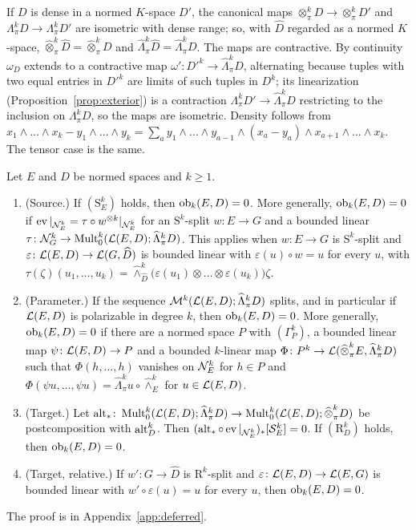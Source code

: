 If $D$ is dense in a normed $K$-space $D'$, the canonical maps $\otimes^k_\pi D\to\otimes^k_\pi D'$ and
$\Lambda^k_\pi D\to\Lambda^k_\pi D'$ are isometric with dense range; so, with $\widehat D$ regarded as a normed $K$-space,
$\widehat\otimes^k_\pi\widehat D=\widehat\otimes^k_\pi D$ and $\widehat\Lambda^k_\pi\widehat D=\widehat\Lambda^k_\pi D$.
The maps are contractive. By continuity $\omega_D$ extends to a contractive map $\omega'\colon D'^k\to\widehat\Lambda^k_\pi D$,
alternating because tuples with two equal entries in $D'^k$ are limits of such tuples in $D^k$; its linearization
(Proposition~\ref{prop:exterior}) is a contraction $\Lambda^k_\pi D'\to\widehat\Lambda^k_\pi D$ restricting to the
inclusion on $\Lambda^k_\pi D$, so the maps are isometric. Density follows from
$x_1\wedge\dots\wedge x_k-y_1\wedge\dots\wedge y_k=\sum_ay_1\wedge\dots\wedge y_{a-1}\wedge(x_a-y_a)\wedge x_{a+1}\wedge\dots\wedge x_k$.
The tensor case is the same.

\begin{theorem}\label{ob:thm:mechanisms}
Let $E$ and $D$ be normed spaces and $k\ge1$.
\begin{enumerate}
\item \textup{(Source.)} If $(\mathrm S^k_E)$ holds, then $\operatorname{ob}_k(E,D)=0$. More generally, $\operatorname{ob}_k(E,D)=0$ if
$\operatorname{ev}|_{\mathcal N^k_E}=\tau\circ w^{\otimes k}|_{\mathcal N^k_E}$ for an $\mathrm S^k$-split $w\colon E\to G$ and a bounded linear
$\tau\colon\mathcal N^k_G\to\operatorname{Mult}^k_0(\mathcal L(E,D);\widehat\Lambda^k_\pi D)$. This applies when $w\colon E\to G$ is
$\mathrm S^k$-split and $\varepsilon\colon\mathcal L(E,D)\to\mathcal L(G,\widehat D)$ is bounded linear with $\varepsilon(u)\circ w=u$
for every $u$, with
$\tau(\zeta)(u_1,\dots,u_k)=\widehat\wedge^k_{\widehat D}\bigl(\varepsilon(u_1)\otimes\dots\otimes\varepsilon(u_k)\bigr)\zeta$.
\item \textup{(Parameter.)} If the sequence $\mathcal M^k(\mathcal L(E,D);\widehat\Lambda^k_\pi D)$ splits, and in particular if
$\mathcal L(E,D)$ is polarizable in degree $k$, then $\operatorname{ob}_k(E,D)=0$. More generally, $\operatorname{ob}_k(E,D)=0$ if there are a normed space $P$ with $(\Gamma^k_P)$, a
bounded linear map $\psi\colon\mathcal L(E,D)\to P$ and a bounded $k$-linear map
$\Phi\colon P^k\to\mathcal L(\widehat\otimes^k_\pi E,\widehat\Lambda^k_\pi D)$ such that $\Phi(h,\dots,h)$ vanishes on $\mathcal N^k_E$
for $h\in P$ and $\Phi(\psi u,\dots,\psi u)=\widehat\Lambda^k_\pi u\circ\widehat\wedge^k_E$ for $u\in\mathcal L(E,D)$.
\item \textup{(Target.)} Let
$\operatorname{alt}_*\colon\operatorname{Mult}^k_0(\mathcal L(E,D);\widehat\Lambda^k_\pi D)\to\operatorname{Mult}^k_0(\mathcal L(E,D);\widehat\otimes^k_\pi D)$ be
postcomposition with $\operatorname{alt}^k_D$. Then
$(\operatorname{alt}_*\circ\operatorname{ev}|_{\mathcal N^k_E})_*[\mathcal S^k_E]=0$. If $(\mathrm R^k_D)$ holds, then $\operatorname{ob}_k(E,D)=0$.
\item[(3$'$)] \textup{(Target, relative.)} If $w'\colon G\to\widehat D$ is $\mathrm R^k$-split and
$\varepsilon\colon\mathcal L(E,D)\to\mathcal L(E,G)$ is bounded linear with $w'\circ\varepsilon(u)=u$ for every $u$, then
$\operatorname{ob}_k(E,D)=0$.
\end{enumerate}
\end{theorem}
The proof is in Appendix~\ref{app:deferred}.

